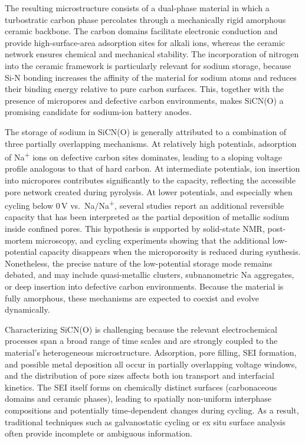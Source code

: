The resulting microstructure consists of a dual-phase material in which a turbostratic carbon phase percolates through a mechanically rigid amorphous ceramic backbone.
The carbon domains facilitate electronic conduction and provide high-surface-area adsorption sites for alkali ions, whereas the ceramic network ensures chemical and mechanical stability. 
The incorporation of nitrogen into the ceramic framework is particularly relevant for sodium storage, because Si-N bonding increases the affinity of the material for sodium atoms and reduces their binding energy relative to pure carbon surfaces. 
This, together with the presence of micropores and defective carbon environments, makes SiCN(O) a promising candidate for sodium-ion battery anodes.

The storage of sodium in SiCN(O) is generally attributed to a combination of three partially overlapping mechanisms. 
At relatively high potentials, adsorption of Na\textsuperscript{+} ions on defective carbon sites dominates, leading to a sloping voltage profile analogous to that of hard carbon. 
At intermediate potentials, ion insertion into micropores contributes significantly to the capacity, reflecting the accessible pore network created during pyrolysis. 
At lower potentials, and especially when cycling below 0\,V vs.\ Na/Na\textsuperscript{+}, several studies report an additional reversible capacity that has been interpreted as the partial deposition of metallic sodium inside confined pores. 
This hypothesis is supported by solid-state NMR, post-mortem microscopy, and cycling experiments showing that the additional low-potential capacity disappears when the microporosity is reduced during synthesis. 
Nonetheless, the precise nature of the low-potential storage mode remains debated, and may include quasi-metallic clusters, subnanometric Na aggregates, or deep insertion into defective carbon environments. 
Because the material is fully amorphous, these mechanisms are expected to coexist and evolve dynamically.

Characterizing SiCN(O) is challenging because the relevant electrochemical processes span a broad range of time scales and are strongly coupled to the material's heterogeneous microstructure.
Adsorption, pore filling, SEI formation, and possible metal deposition all occur in partially overlapping voltage windows, and the distribution of pore sizes affects both ion transport and interfacial kinetics. 
The SEI itself forms on chemically distinct surfaces (carbonaceous domains and ceramic phases), leading to spatially non-uniform interphase compositions and potentially time-dependent changes during cycling. 
As a result, traditional techniques such as galvanostatic cycling or ex situ surface analysis often provide incomplete or ambiguous information.

